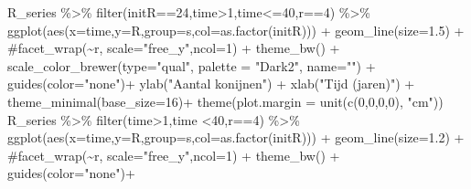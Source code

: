 \documentclass[
  a4paper,
]{scrbook}
\newenvironment{Shaded}{\begin{snugshade}}{\end{snugshade}}
\newcommand{\AttributeTok}[1]{\textcolor[rgb]{0.40,0.45,0.13}{#1}}
\newcommand{\CommentTok}[1]{\textcolor[rgb]{0.37,0.37,0.37}{#1}}
\newcommand{\DecValTok}[1]{\textcolor[rgb]{0.68,0.00,0.00}{#1}}
\newcommand{\FloatTok}[1]{\textcolor[rgb]{0.68,0.00,0.00}{#1}}
\newcommand{\FunctionTok}[1]{\textcolor[rgb]{0.28,0.35,0.67}{#1}}
\newcommand{\NormalTok}[1]{\textcolor[rgb]{0.00,0.23,0.31}{#1}}
\newcommand{\SpecialCharTok}[1]{\textcolor[rgb]{0.37,0.37,0.37}{#1}}
\newcommand{\StringTok}[1]{\textcolor[rgb]{0.13,0.47,0.30}{#1}}
\theoremstyle{definition}
\theoremstyle{remark}
\begin{document}
\begin{Shaded}
\begin{Highlighting}[]
\NormalTok{R\_series }\SpecialCharTok{\%\textgreater{}\%} \FunctionTok{filter}\NormalTok{(initR}\SpecialCharTok{==}\DecValTok{24}\NormalTok{,time}\SpecialCharTok{\textgreater{}}\DecValTok{1}\NormalTok{,time}\SpecialCharTok{\textless{}=}\DecValTok{40}\NormalTok{,r}\SpecialCharTok{==}\DecValTok{4}\NormalTok{) }\SpecialCharTok{\%\textgreater{}\%} 
  \FunctionTok{ggplot}\NormalTok{(}\FunctionTok{aes}\NormalTok{(}\AttributeTok{x=}\NormalTok{time,}\AttributeTok{y=}\NormalTok{R,}\AttributeTok{group=}\NormalTok{s,}\AttributeTok{col=}\FunctionTok{as.factor}\NormalTok{(initR))) }\SpecialCharTok{+} 
  \FunctionTok{geom\_line}\NormalTok{(}\AttributeTok{size=}\FloatTok{1.5}\NormalTok{) }\SpecialCharTok{+} 
  \CommentTok{\#facet\_wrap(\textasciitilde{}r, scale="free\_y",ncol=1) + }
  \FunctionTok{theme\_bw}\NormalTok{() }\SpecialCharTok{+}
  \FunctionTok{scale\_color\_brewer}\NormalTok{(}\AttributeTok{type=}\StringTok{"qual"}\NormalTok{, }\AttributeTok{palette =} \StringTok{"Dark2"}\NormalTok{, }\AttributeTok{name=}\StringTok{""}\NormalTok{) }\SpecialCharTok{+}
  \FunctionTok{guides}\NormalTok{(}\AttributeTok{color=}\StringTok{"none"}\NormalTok{)}\SpecialCharTok{+}
  \FunctionTok{ylab}\NormalTok{(}\StringTok{"Aantal konijnen"}\NormalTok{) }\SpecialCharTok{+}
  \FunctionTok{xlab}\NormalTok{(}\StringTok{"Tijd (jaren)"}\NormalTok{) }\SpecialCharTok{+}
  \FunctionTok{theme\_minimal}\NormalTok{(}\AttributeTok{base\_size=}\DecValTok{16}\NormalTok{)}\SpecialCharTok{+}
  \FunctionTok{theme}\NormalTok{(}\AttributeTok{plot.margin =} \FunctionTok{unit}\NormalTok{(}\FunctionTok{c}\NormalTok{(}\DecValTok{0}\NormalTok{,}\DecValTok{0}\NormalTok{,}\DecValTok{0}\NormalTok{,}\DecValTok{0}\NormalTok{), }\StringTok{"cm"}\NormalTok{))}
\NormalTok{R\_series }\SpecialCharTok{\%\textgreater{}\%} \FunctionTok{filter}\NormalTok{(time}\SpecialCharTok{\textgreater{}}\DecValTok{1}\NormalTok{,time }\SpecialCharTok{\textless{}}\DecValTok{40}\NormalTok{,r}\SpecialCharTok{==}\DecValTok{4}\NormalTok{) }\SpecialCharTok{\%\textgreater{}\%} 
  \FunctionTok{ggplot}\NormalTok{(}\FunctionTok{aes}\NormalTok{(}\AttributeTok{x=}\NormalTok{time,}\AttributeTok{y=}\NormalTok{R,}\AttributeTok{group=}\NormalTok{s,}\AttributeTok{col=}\FunctionTok{as.factor}\NormalTok{(initR))) }\SpecialCharTok{+} 
  \FunctionTok{geom\_line}\NormalTok{(}\AttributeTok{size=}\FloatTok{1.2}\NormalTok{) }\SpecialCharTok{+} 
  \CommentTok{\#facet\_wrap(\textasciitilde{}r, scale="free\_y",ncol=1) + }
  \FunctionTok{theme\_bw}\NormalTok{() }\SpecialCharTok{+}
  \FunctionTok{guides}\NormalTok{(}\AttributeTok{color=}\StringTok{"none"}\NormalTok{)}\SpecialCharTok{+}

\end{Highlighting}
\end{Shaded}
\end{document}
